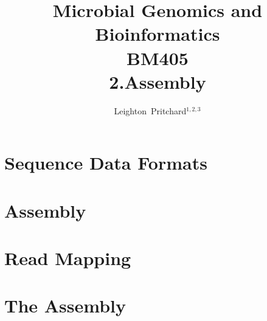 
\title[Microbial Genomics and Bioinformatics: 2.Assembly] %
{Microbial Genomics and \\ Bioinformatics \\
BM405 \\
2.Assembly}
\author[Pritchard] %
{Leighton~Pritchard$^{1,2,3}$}
\subject{Bioinformatics, Genomics, Bacteria, Sequencing, Microbiology, Microbes}

\frame[plain]{\titlepage}



\section{Sequence Data Formats}


\section{Assembly}


\section{Read Mapping}


\section{The Assembly}



%

